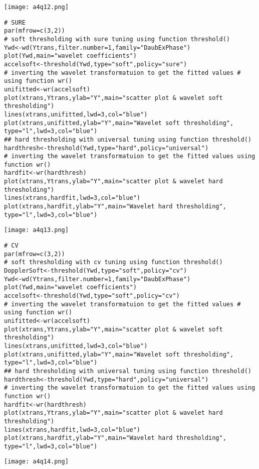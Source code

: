 \documentclass[11pt]{report}
\begin{document}
\texttt{[image: a4q12.png]}

\begin{verbatim}
# SURE
par(mfrow=c(3,2))
# soft thresholding with sure tuning using function threshold() 
Ywd<-wd(Ytrans,filter.number=1,family="DaubExPhase")
plot(Ywd,main="wavelet coefficients")
accelsoft<-threshold(Ywd,type="soft",policy="sure")
# inverting the wavelet transformatuion to get the fitted values # using function wr()
unifitted<-wr(accelsoft)
plot(xtrans,Ytrans,ylab="Y",main="scatter plot & wavelet soft thresholding")
lines(xtrans,unifitted,lwd=3,col="blue")
plot(xtrans,unifitted,ylab="Y",main="Wavelet soft thresholding", type="l",lwd=3,col="blue")
## hard thresholding with universal tuning using function threshold() 
hardthresh<-threshold(Ywd,type="hard",policy="universal")
# inverting the wavelet transformatuion to get the fitted values using function wr() 
hardfit<-wr(hardthresh)
plot(xtrans,Ytrans,ylab="Y",main="scatter plot & wavelet hard thresholding") 
lines(xtrans,hardfit,lwd=3,col="blue")
plot(xtrans,hardfit,ylab="Y",main="Wavelet hard thresholding", type="l",lwd=3,col="blue")
\end{verbatim}

\texttt{[image: a4q13.png]}

\begin{verbatim}
# CV
par(mfrow=c(3,2))
# soft thresholding with cv tuning using function threshold() DopplerSoft<-threshold(Ywd,type="soft",policy="cv")
Ywd<-wd(Ytrans,filter.number=1,family="DaubExPhase")
plot(Ywd,main="wavelet coefficients")
accelsoft<-threshold(Ywd,type="soft",policy="cv")
# inverting the wavelet transformatuion to get the fitted values # using function wr()
unifitted<-wr(accelsoft)
plot(xtrans,Ytrans,ylab="Y",main="scatter plot & wavelet soft thresholding")
lines(xtrans,unifitted,lwd=3,col="blue")
plot(xtrans,unifitted,ylab="Y",main="Wavelet soft thresholding", type="l",lwd=3,col="blue")
## hard thresholding with universal tuning using function threshold() 
hardthresh<-threshold(Ywd,type="hard",policy="universal")
# inverting the wavelet transformatuion to get the fitted values using function wr() 
hardfit<-wr(hardthresh)
plot(xtrans,Ytrans,ylab="Y",main="scatter plot & wavelet hard thresholding") 
lines(xtrans,hardfit,lwd=3,col="blue")
plot(xtrans,hardfit,ylab="Y",main="Wavelet hard thresholding", type="l",lwd=3,col="blue")
\end{verbatim}

\texttt{[image: a4q14.png]}
\end{document}
